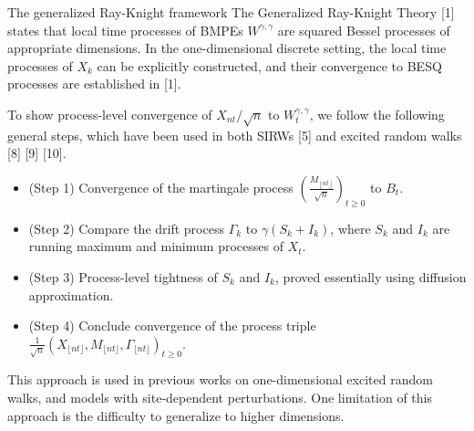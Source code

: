 \begin{mainbox}{The generalized Ray-Knight framework}
    The Generalized Ray-Knight Theory [1] states that local time processes of BMPEs $W^{\gamma, \gamma}$ are squared Bessel processes of appropriate dimensions. 
    In the one-dimensional discrete setting, the local time processes of $X_k$ can be explicitly constructed, and their convergence to BESQ processes are established in [1].

    To show process-level convergence of $X_{nt} / \sqrt{n}$ to $W^{\gamma, \gamma}_t$, we follow the following general steps, which have been used in both SIRWs [5] and excited random walks [8] [9] [10].
    
    \begin{itemize}
        \item (Step 1) Convergence of the martingale process $\left( \frac{M_{\left\lfloor n t \right\rfloor}}{\sqrt{n}} \right) _{t \ge 0}$ to $B_t$.
        \item (Step 2) Compare the drift process $\Gamma_k$ to $\gamma (S_k + I_k)$, where $S_k$ and $I_k$ are running maximum and minimum processes of $X_t$.
        \item (Step 3) Process-level tightness of $S_k$ and $I_k$, proved essentially using diffusion approximation.
        \item (Step 4) Conclude convergence of the process triple $\frac{1}{\sqrt{n}}\left(X_{\lfloor n t\rfloor}, M_{\lfloor n t\rfloor}, \Gamma_{\lfloor n t\rfloor}\right)_{t \geq 0}$. %
    \end{itemize}
    This approach is used in previous works on one-dimensional excited random walks, and models with site-dependent perturbations.
    One limitation of this approach is the difficulty to generalize to higher dimensions.
\end{mainbox}


